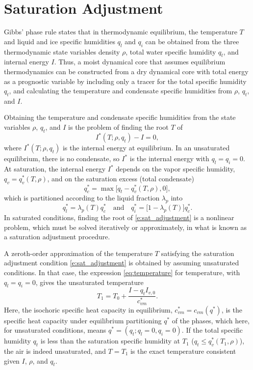 \documentclass{report}
\begin{document}
\section{Saturation Adjustment}
\label{sct:sat_adj}
Gibbs' phase rule states that in thermodynamic equilibrium, the temperature $T$ and liquid and ice specific humidities $q_l$ and $q_i$ can be obtained from the three thermodynamic state variables density $\rho$, total water specific humidity $q_t$, and internal energy $I$. Thus, a moist dynamical core that assumes equilibrium thermodynamics can be constructed from a dry dynamical core with total energy as a prognostic variable by including only a tracer for the total specific humidity $q_t$, and calculating the temperature and condensate specific humidities from $\rho$, $q_t$, and $I$. 

Obtaining the temperature and condensate specific humidities from the state variables $\rho$, $q_t$, and $I$ is the problem of finding the root $T$ of
\begin{equation}\label{e:sat_adjustment}
I^*(T; \rho, q_t) - I = 0,
\end{equation}
where $I^*(T; \rho, q_t)$ is the internal energy at equilibrium. In an unsaturated equilibrium, there is no condensate, so $I^*$ is the internal energy with $q_l=q_i=0$. At saturation, the internal energy $I^*$ depends on the vapor specific humidity, $q_v = q_v^*(T, \rho)$, and on the saturation excess (total condensate) 
\begin{equation}
q_c^* = \max\bigl[q_t - q_v^*(T, \rho), 0\bigr], 
\end{equation}
which is partitioned according to the liquid fraction $\lambda_p$ into 
\begin{equation}\label{e:phase_partition}
q_l^* = \lambda_p(T) q_c^* \quad \text{and} \quad q_i^* = \bigl[1-\lambda_p(T)\bigr]q_c^*.
\end{equation} 
In saturated conditions, finding the root of \eqref{e:sat_adjustment} is a nonlinear problem, which must be solved iteratively or approximately, in what is known as a saturation adjustment procedure. 

A zeroth-order approximation of the temperature $T$ satisfying the saturation adjustment condition \eqref{e:sat_adjustment} is obtained by assuming unsaturated conditions. In that case, the expression \eqref{eq:temperature} for temperature, with $q_l=q_i=0$, gives the unsaturated temperature 
\begin{equation}
    T_1 = T_0 + \frac{I - q_t I_{v,0}}{c_{vm}^*}.
\end{equation}
Here, the isochoric specific heat capacity in equilibrium, $c_{vm}^* = c_{vm}(q^*)$, is the specific heat capacity under equilibrium partitioning $q^*$ of the phases, which here, for unsaturated conditions, means $q^*=(q_t; q_l=0, q_i=0)$. If the total specific humidity $q_t$ is less than the saturation specific humidity at $T_1$ ($q_t \le q_v^*(T_1, \rho)$), the air is indeed unsaturated, and $T=T_1$ is the exact temperature consistent given $I$, $\rho$, and $q_t$. 
\end{document}
